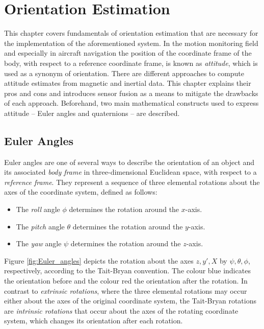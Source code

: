 \chapter{Orientation Estimation}
\label{ch:orientation_estimation}

This chapter covers fundamentals of orientation estimation that are necessary for the implementation of the aforementioned system. In the motion monitoring field and especially in aircraft navigation the position of the coordinate frame of the body, with respect to a reference coordinate frame, is known as \emph{attitude}, which is used as a synonym of orientation. There are different approaches to compute attitude estimates from magnetic and inertial data. This chapter explains their pros and cons and introduces sensor fusion as a means to mitigate the drawbacks of each approach. Beforehand, two main mathematical constructs used to express attitude -- Euler angles and quaternions -- are described.

\section{Euler Angles}

Euler angles are one of several ways to describe the orientation of an object and its associated \emph{body frame} in three-dimensional Euclidean space, with respect to a \emph{reference frame}. They represent a sequence of three elemental rotations about the axes of the coordinate system, defined as follows:

\begin{itemize}
\item The \emph{roll} angle $\phi$ determines the rotation around the $x$-axis.
\item The \emph{pitch} angle $\theta$ determines the rotation around the $y$-axis.
\item The \emph{yaw} angle $\psi$ determines the rotation around the $z$-axis.
\end{itemize}

\noindent
Figure \ref{fig:Euler_angles} depicts the rotation about the axes $z, y', X$ by $\psi, \theta, \phi$, respectively, according to the Tait-Bryan convention. The colour blue indicates the orientation before and the colour red the orientation after the rotation. In contrast to \emph{extrinsic rotations}, where the three elemental rotations may occur either about the axes of the original coordinate system, the Tait-Bryan rotations are \emph{intrinsic rotations} that occur about the axes of the rotating coordinate system, which changes its orientation after each rotation.


